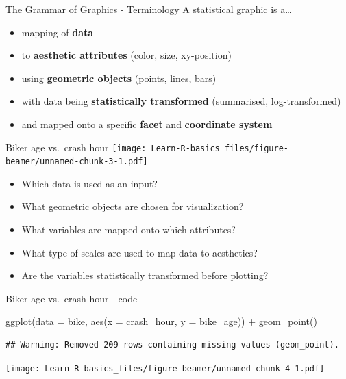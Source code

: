 \documentclass[
  ignorenonframetext,
]{beamer}
\newenvironment{Shaded}{\begin{snugshade}}{\end{snugshade}}
\newcommand{\AttributeTok}[1]{\textcolor[rgb]{0.77,0.63,0.00}{#1}}
\newcommand{\FunctionTok}[1]{\textcolor[rgb]{0.00,0.00,0.00}{#1}}
\newcommand{\NormalTok}[1]{#1}
\newcommand{\SpecialCharTok}[1]{\textcolor[rgb]{0.00,0.00,0.00}{#1}}
\providecommand{\tightlist}{%
  \setlength{\itemsep}{0pt}\setlength{\parskip}{0pt}}
\begin{document}
\begin{frame}{The Grammar of Graphics - Terminology}
\protect\hypertarget{the-grammar-of-graphics---terminology}{}
A statistical graphic is a\ldots{}

\begin{itemize}
\tightlist
\item
  mapping of \textbf{data}
\item
  to \textbf{aesthetic attributes} (color, size, xy-position)
\item
  using \textbf{geometric objects} (points, lines, bars)
\item
  with data being \textbf{statistically transformed} (summarised,
  log-transformed)
\item
  and mapped onto a specific \textbf{facet} and \textbf{coordinate
  system}
\end{itemize}
\end{frame}

\begin{frame}{Biker age vs.~crash hour}
\protect\hypertarget{biker-age-vs.-crash-hour}{}
\texttt{[image: Learn-R-basics\_files/figure-beamer/unnamed-chunk-3-1.pdf]}

\begin{itemize}
\tightlist
\item
  Which data is used as an input?
\item
  What geometric objects are chosen for visualization?
\item
  What variables are mapped onto which attributes?
\item
  What type of scales are used to map data to aesthetics?
\item
  Are the variables statistically transformed before plotting?
\end{itemize}
\end{frame}

\begin{frame}[fragile]{Biker age vs.~crash hour - code}
\protect\hypertarget{biker-age-vs.-crash-hour---code}{}
\begin{Shaded}
\begin{Highlighting}[]
\FunctionTok{ggplot}\NormalTok{(}\AttributeTok{data =}\NormalTok{ bike, }\FunctionTok{aes}\NormalTok{(}\AttributeTok{x =}\NormalTok{ crash\_hour, }\AttributeTok{y =}\NormalTok{ bike\_age)) }\SpecialCharTok{+}
  \FunctionTok{geom\_point}\NormalTok{()}
\end{Highlighting}
\end{Shaded}

\begin{verbatim}
## Warning: Removed 209 rows containing missing values (geom_point).
\end{verbatim}

\texttt{[image: Learn-R-basics\_files/figure-beamer/unnamed-chunk-4-1.pdf]}
\end{frame}
\end{document}
